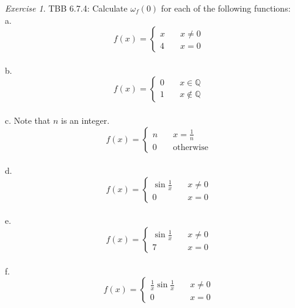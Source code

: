 \documentclass[12pt,oneside]{amsart}
\theoremstyle{definition}
\theoremstyle{remark}
\newtheorem{exer}{Exercise}
\numberwithin{equation}{exer}
\begin{document}
\newpage
\begin{exer}
TBB 6.7.4: Calculate $\omega_f(0)$ for each of the following functions: \\
a. \begin{equation*}
f(x) = \left\{
        \begin{array}{ll}
            x & \quad x \neq 0 \\
            4 & \quad x = 0
        \end{array}
    \right.
\end{equation*} \\
b. \begin{equation*}
f(x) = \left\{
        \begin{array}{ll}
            0 & \quad x \in \mathbb{Q} \\
            1 & \quad x \notin \mathbb{Q}
        \end{array}
    \right.
\end{equation*} \\
c. Note that $n$ is an integer. \begin{equation*}
f(x) = \left\{
        \begin{array}{ll}
            n & \quad x=\frac{1}{n} \\
            0 & \quad \text{otherwise}
        \end{array}
    \right.
\end{equation*}\\
d. \begin{equation*}
f(x) = \left\{
        \begin{array}{ll}
            \sin\frac{1}{x} & \quad x \neq 0 \\
            0 & \quad x=0
        \end{array}
    \right.
\end{equation*} \\
e. \begin{equation*}
f(x) = \left\{
        \begin{array}{ll}
            \sin\frac{1}{x} & \quad x \neq 0 \\
            7 & \quad x=0
        \end{array}
    \right.
\end{equation*} \\
f. \begin{equation*}
f(x) = \left\{
        \begin{array}{ll}
            \frac{1}{x}\sin\frac{1}{x} & \quad x \neq 0 \\
            0 & \quad x=0
        \end{array}
    \right.
\end{equation*} 
\end{exer}
\end{document}
